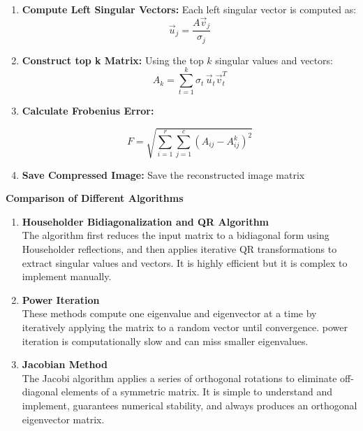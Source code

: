 \documentclass[journal]{IEEEtran}
\begin{document}
\begin{enumerate}
    \item \textbf{Compute Left Singular Vectors:}  
    Each left singular vector is computed as:
    \[
    \vec{u}_j = \frac{A \vec{v}_j}{\sigma_j}
    \]

    \item \textbf{Construct top k Matrix:}  
    Using the top \( k \) singular values and vectors:
    \[
    A_k = \sum_{t=1}^{k} \sigma_t \, \vec{u}_t \vec{v}_t^T
    \]

    \item \textbf{Calculate Frobenius Error:}  

    \[
    F = \sqrt{ \sum_{i=1}^{r} \sum_{j=1}^{c} (A_{ij} - A_{ij}^{k})^2 }
    \]

    \item \textbf{Save Compressed Image:}  
    Save the reconstructed image matrix \\

\end{enumerate}

\textbf{Comparison of Different Algorithms}
\begin{enumerate}
    \item \textbf{Householder Bidiagonalization and QR Algorithm} \\   
    The algorithm first reduces the input matrix to a bidiagonal form using Householder reflections, 
    and then applies iterative QR transformations to extract singular values and vectors.  
    It is highly efficient but it is complex to implement manually.\\

    \item \textbf{Power Iteration}  \\
    These methods compute one eigenvalue and eigenvector at a time by iteratively applying 
    the matrix to a random vector until convergence.  
    power iteration is computationally slow and can miss smaller eigenvalues.\\

    \item \textbf{Jacobian Method}  \\
    The Jacobi algorithm applies a series of orthogonal rotations 
    to eliminate off-diagonal elements of a symmetric matrix.  
    It is simple to understand and implement, guarantees numerical stability, 
    and always produces an orthogonal eigenvector matrix.\\
\end{enumerate}
\end{document}
